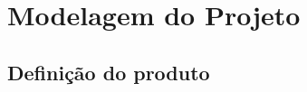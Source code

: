 \chapter{Modelagem do Projeto} \label{cha:modelagem}

\section{Definição do produto} \label{sec:ctb:definicao}






